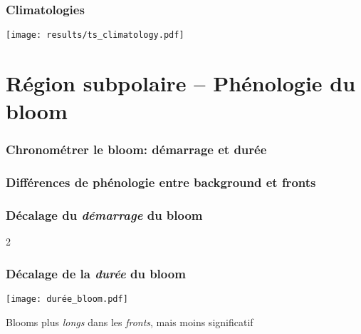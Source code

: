 \documentclass[11pt, french, aspectratio=32]{beamer}
\begin{document}

\begin{frame}
  \frametitle{Climatologies}
  \texttt{[image: results/ts\_climatology.pdf]}
\end{frame}


\section{Région subpolaire -- Phénologie du bloom}


\begin{frame}
  \frametitle{Chronométrer le bloom: démarrage et durée}
\end{frame}


\begin{frame}
  \frametitle{Différences de phénologie entre background et fronts}
\end{frame}


\begin{frame}
  \frametitle{Décalage du \emph{\textit{démarrage}} du bloom}

  \vfill

  \begin{overlayarea}{\textwidth}{2\baselineskip}

  \end{overlayarea}
\end{frame}


\begin{frame}
  \frametitle{Décalage de la \emph{\textit{durée}} du bloom}
  \texttt{[image: durée\_bloom.pdf]}

  \vfill

  Blooms plus \emph{longs} dans les \emph{fronts}, mais moins significatif
\end{frame}
\end{document}
